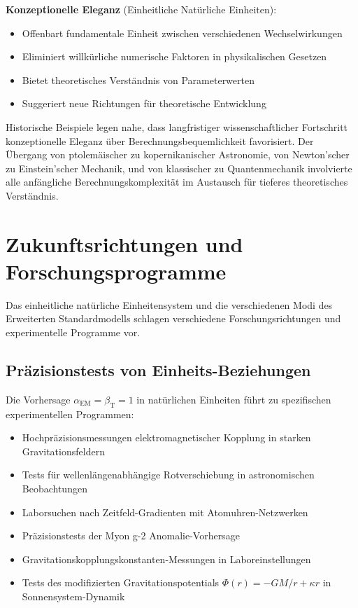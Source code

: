 \documentclass[12pt,a4paper]{article}
\newcommand{\alphaEM}{\alpha_{\text{EM}}}
\newcommand{\betaT}{\beta_{\text{T}}}
\begin{document}
	\textbf{Konzeptionelle Eleganz} (Einheitliche Natürliche Einheiten):
	\begin{itemize}
		\item Offenbart fundamentale Einheit zwischen verschiedenen Wechselwirkungen
		\item Eliminiert willkürliche numerische Faktoren in physikalischen Gesetzen
		\item Bietet theoretisches Verständnis von Parameterwerten
		\item Suggeriert neue Richtungen für theoretische Entwicklung
	\end{itemize}
	
	Historische Beispiele legen nahe, dass langfristiger wissenschaftlicher Fortschritt konzeptionelle Eleganz über Berechnungsbequemlichkeit favorisiert. Der Übergang von ptolemäischer zu kopernikanischer Astronomie, von Newton'scher zu Einstein'scher Mechanik, und von klassischer zu Quantenmechanik involvierte alle anfängliche Berechnungskomplexität im Austausch für tieferes theoretisches Verständnis.
	
	\section{Zukunftsrichtungen und Forschungsprogramme}
	\label{sec:future_directions}
	
	Das einheitliche natürliche Einheitensystem und die verschiedenen Modi des Erweiterten Standardmodells schlagen verschiedene Forschungsrichtungen und experimentelle Programme vor.
	
	\subsection{Präzisionstests von Einheits-Beziehungen}
	\label{subsec:precision_tests}
	
	Die Vorhersage $\alphaEM = \betaT = 1$ in natürlichen Einheiten führt zu spezifischen experimentellen Programmen:
	
	\begin{itemize}
		\item Hochpräzisionsmessungen elektromagnetischer Kopplung in starken Gravitationsfeldern
		\item Tests für wellenlängenabhängige Rotverschiebung in astronomischen Beobachtungen
		\item Laborsuchen nach Zeitfeld-Gradienten mit Atomuhren-Netzwerken
		\item Präzisionstests der Myon g-2 Anomalie-Vorhersage
		\item Gravitationskopplungskonstanten-Messungen in Laboreinstellungen
		\item Tests des modifizierten Gravitationspotentials $\Phi(r) = -GM/r + \kappa r$ in Sonnensystem-Dynamik
	\end{itemize}
	
\end{document}

